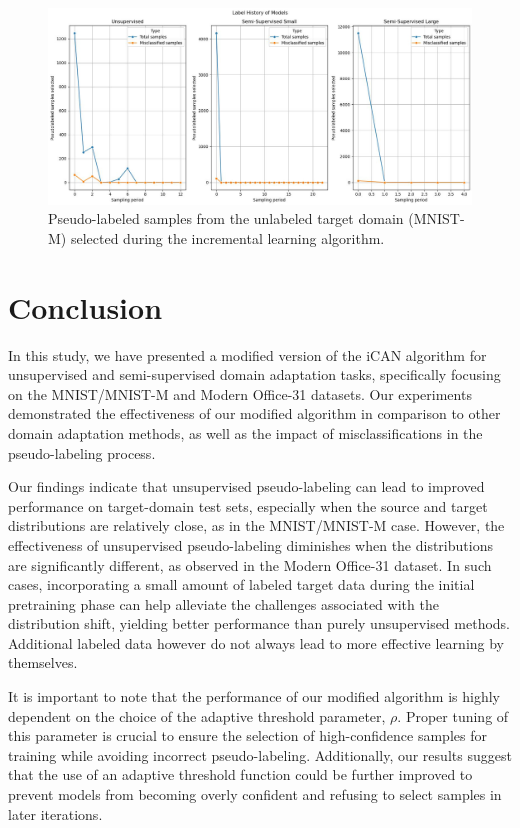 \documentclass[12pt, a4paper]{article}
\begin{document}
	\begin{figure}
		\centering
		\includegraphics[width=12cm]{"mnist_misclassifications.jpeg"}
		\caption{Pseudo-labeled samples from the unlabeled target domain (MNIST-M) selected during the incremental learning algorithm.}
		\label{fig::mnist_misclassifications}
	\end{figure}

	\section{Conclusion}
	
	In this study, we have presented a modified version of the iCAN algorithm for unsupervised and semi-supervised domain adaptation tasks, specifically focusing on the MNIST/MNIST-M and Modern Office-31 datasets. Our experiments demonstrated the effectiveness of our modified algorithm in comparison to other domain adaptation methods, as well as the impact of misclassifications in the pseudo-labeling process.
	
	Our findings indicate that unsupervised pseudo-labeling can lead to improved performance on target-domain test sets, especially when the source and target distributions are relatively close, as in the MNIST/MNIST-M case. However, the effectiveness of unsupervised pseudo-labeling diminishes when the distributions are significantly different, as observed in the Modern Office-31 dataset. In such cases, incorporating a small amount of labeled target data during the initial pretraining phase can help alleviate the challenges associated with the distribution shift, yielding better performance than purely unsupervised methods. Additional labeled data however do not always lead to more effective learning by themselves.
	
	It is important to note that the performance of our modified algorithm is highly dependent on the choice of the adaptive threshold parameter, $\rho$. Proper tuning of this parameter is crucial to ensure the selection of high-confidence samples for training while avoiding incorrect pseudo-labeling. Additionally, our results suggest that the use of an adaptive threshold function could be further improved to prevent models from becoming overly confident and refusing to select samples in later iterations.

	
	\printbibliography
\end{document}
